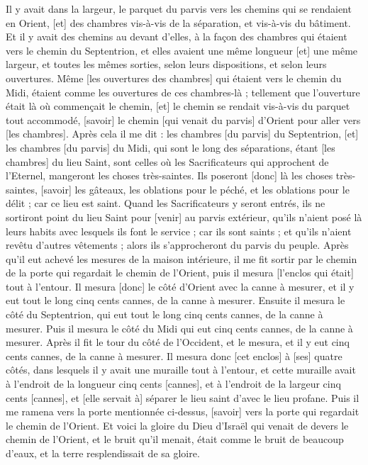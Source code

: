 \begin{multicols}{2}
Il y avait dans la largeur, le parquet du parvis vers les chemins qui se rendaient en Orient, [et] des chambres vis-à-vis de la séparation, et vis-à-vis du bâtiment.
Et il y avait des chemins au devant d'elles, à la façon des chambres qui étaient vers le chemin du Septentrion, et elles avaient une même longueur [et] une même largeur, et toutes les mêmes sorties, selon leurs dispositions, et selon leurs ouvertures.
Même [les ouvertures des chambres] qui étaient vers le chemin du Midi, étaient comme les ouvertures de ces chambres-là ; tellement que l'ouverture était là où commençait le chemin, [et] le chemin se rendait vis-à-vis du parquet tout accommodé, [savoir] le chemin [qui venait du parvis] d'Orient pour aller vers [les chambres].
Après cela il me dit : les chambres [du parvis] du Septentrion, [et] les chambres [du parvis] du Midi, qui sont le long des séparations, étant [les chambres] du lieu Saint, sont celles où les Sacrificateurs qui approchent de l'Eternel, mangeront les choses très-saintes. Ils poseront [donc] là les choses très-saintes, [savoir] les gâteaux, les oblations pour le péché, et les oblations pour le délit ; car ce lieu est saint.
Quand les Sacrificateurs y seront entrés, ils ne sortiront point du lieu Saint pour [venir] au parvis extérieur, qu'ils n'aient posé là leurs habits avec lesquels ils font le service ; car ils sont saints ; et qu'ils n'aient revêtu d'autres vêtements ; alors ils s'approcheront du parvis du peuple.
Après qu'il eut achevé les mesures de la maison intérieure, il me fit sortir par le chemin de la porte qui regardait le chemin de l'Orient, puis il mesura [l'enclos qui était] tout à l'entour.
Il mesura [donc] le côté d'Orient avec la canne à mesurer, et il y eut tout le long cinq cents cannes, de la canne à mesurer.
Ensuite il mesura le côté du Septentrion, qui eut tout le long cinq cents cannes, de la canne à mesurer.
Puis il mesura le côté du Midi qui eut cinq cents cannes, de la canne à mesurer.
Après il fit le tour du côté de l'Occident, et le mesura, et il y eut cinq cents cannes, de la canne à mesurer.
Il mesura donc [cet enclos] à [ses] quatre côtés, dans lesquels il y avait une muraille tout à l'entour, et cette muraille avait à l'endroit de la longueur cinq cents [cannes], et à l'endroit de la largeur cinq cents [cannes], et [elle servait à] séparer le lieu saint d'avec le lieu profane.
\VerseOne{}Puis il me ramena vers la porte mentionnée ci-dessus, [savoir] vers la porte qui regardait le chemin de l'Orient.
Et voici la gloire du Dieu d'Israël qui venait de devers le chemin de l'Orient, et le bruit qu'il menait, était comme le bruit de beaucoup d'eaux, et la terre resplendissait de sa gloire.

\end{multicols}
